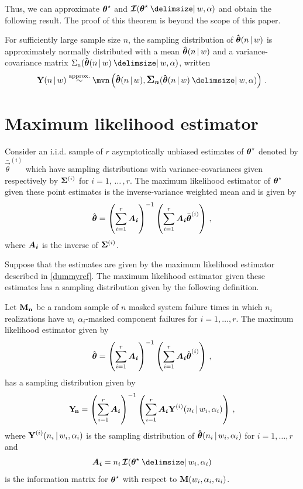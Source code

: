 \documentclass[
    11pt,
    extrafontsizes,
    article,
    oldfontcommands,
    final,
    oneside,
    openany,
    hidelinks]{memoir}
\begin{document}
\fussy
Thus, we can approximate $\tparam\sysparamvec$ and $\infomatrx(\tparam\sysparamvec \Given w, \alpha)$ and obtain the following result. The proof of this theorem is beyond the scope of this paper.
\begin{theorem}
\label{thm:approx_normal}
For sufficiently large sample size $n$, the sampling distribution of $\mle$ is approximately normally distributed with a mean $\mle$ and a variance-covariance matrix $\cov(\mle \Given w, \alpha)$, written
\begin{equation}
\label{eq:asymptotic_normality}
    \sampd \stackrel{\text{approx.}}{\sim} \mvn\left(\mle, \cov(\mle \Given w, \alpha)\right)\,.
\end{equation}
\end{theorem}

\section{Maximum likelihood estimator}
\label{sec:full_samp_dist}
Consider an i.i.d. sample of $r$ asymptotically unbiased estimates of $\tparam\sysparamvec$ denoted by $\bar{\vec\theta}^{(i)}$ which have sampling distributions with variance-covariances given respectively by $\matrx{\Sigma}^{(i)}$ for $i=1,\,\ldots\,,r$.
The maximum likelihood estimator of $\tparam\sysparamvec$ given these point estimates is the inverse-variance weighted mean and is given by
\begin{equation}
    \hat{\vec\theta} = \left( \sum_{i=1}^{r} \matrx{A_i} \right)^{-1}
    \left( \sum_{i=1}^{r} \matrx{A_i} \bar{\vec\theta}^{(i)} \right)\,,
\end{equation}
where $\matrx{A_i}$ is the inverse of $\matrx{\Sigma}^{(i)}$.

Suppose that the estimates are given by the maximum likelihood estimator described in \cref{dummyref}.
The maximum likelihood estimator given these estimates has a sampling distribution given by the following definition.
\begin{definition}
Let $\mfs$ be a random sample of $n$ masked system failure times in which $n_i$ realizations have $w_i$ $\alpha_i$-masked component failures for $i = 1,\ldots,r$.
The maximum likelihood estimator given by
\begin{equation}
    \hat{\sysparamvec} = \left( \sum_{i=1}^{r} \matrx{A_i} \right)^{-1}
    \left( \sum_{i=1}^{r} \matrx{A_i} \hat\sysparamvec^{(i)} \right)\,,
\end{equation}
has a sampling distribution given by
\begin{equation}
    \sampdu = \left( \sum_{i=1}^{r} \matrx{A_i} \right)^{-1}
    \left( \sum_{i=1}^{r} \matrx{A_i} \sampdir{n_i}{w_i,\alpha_i}{i}\right)\,,
\end{equation}
where $\sampdir{n_i}{w_i,\alpha_i}{i}$ is the sampling distribution of $\mleir{n_i}{w_i,\alpha_i}$ for $i=1,\ldots,r$ and
\begin{equation}
\label{eq:mat_A_info}
    \matrx{A_i} = n_i \infomatrx(\tparam\sysparamvec \Given w_i, \alpha_i)
\end{equation}
is the information matrix for $\tparam\sysparamvec$ with respect to $\mfswn{n_i}{w_i,\alpha_i}$.
\end{definition}
\end{document}
